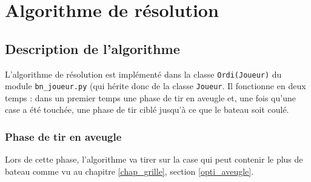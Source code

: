 \chapter{Algorithme de résolution}

\section{Description de l'algorithme}
L'algorithme de résolution est implémenté dans la classe \texttt{Ordi(Joueur)} du module \texttt{bn\_joueur.py} (qui hérite donc de la classe \texttt{Joueur}. Il fonctionne en deux temps : dans un premier temps une phase de tir en aveugle et, une fois qu'une case a été touchée, une phase de tir ciblé jusqu'à ce que le bateau soit coulé.

\subsection{Phase de tir en aveugle}
Lors de cette phase, l'algorithme va tirer sur la case qui peut contenir le plus de bateau comme vu au chapitre \ref{chap_grille}, section \ref{opti_aveugle}.

